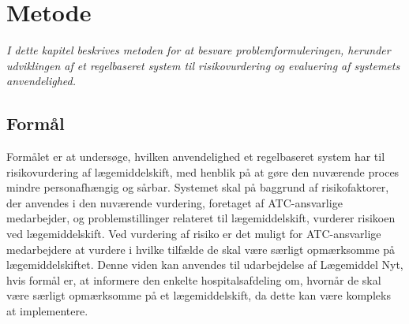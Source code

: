 \chapter{Metode}
\textit{I dette kapitel beskrives metoden for at besvare problemformuleringen, herunder udviklingen af et regelbaseret system til risikovurdering og evaluering af systemets anvendelighed.}

\section{Formål}
Formålet er at undersøge, hvilken anvendelighed et regelbaseret system har til risikovurdering af lægemiddelskift, med henblik på at gøre den nuværende proces mindre personafhængig og sårbar. Systemet skal på baggrund af risikofaktorer, der anvendes i den nuværende vurdering, foretaget af ATC-ansvarlige medarbejder, og problemstillinger relateret til lægemiddelskift, vurderer risikoen ved lægemiddelskift. Ved vurdering af risiko er det muligt for ATC-ansvarlige medarbejdere at vurdere i hvilke tilfælde de skal være særligt opmærksomme på lægemiddelskiftet. Denne viden kan anvendes til udarbejdelse af Lægemiddel Nyt, hvis formål er, at informere den enkelte hospitalsafdeling om, hvornår de skal være særligt opmærksomme på et lægemiddelskift, da dette kan være kompleks at implementere.







